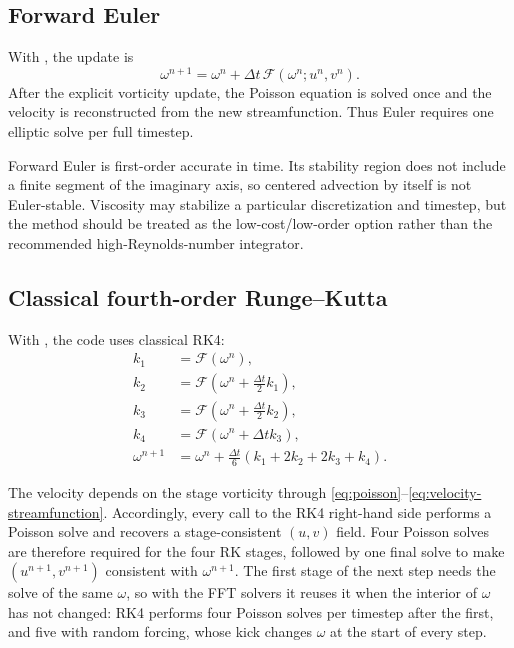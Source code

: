 \documentclass[11pt,a4paper]{article}
\newcommand{\dt}{\Delta t}
\newcommand{\code}[1]{\texttt{\detokenize{#1}}}
\begin{document}
\subsection{Forward Euler}

With \code{time_scheme = 1}, the update is
\begin{equation}
\omega^{n+1}
=\omega^n+\dt\,\mathcal{F}(\omega^n;u^n,v^n).
\label{eq:euler}
\end{equation}
After the explicit vorticity update, the Poisson equation is solved once and the velocity is reconstructed from the new streamfunction.  Thus Euler requires one elliptic solve per full timestep.

Forward Euler is first-order accurate in time.  Its stability region does not include a finite segment of the imaginary axis, so centered advection by itself is not Euler-stable.  Viscosity may stabilize a particular discretization and timestep, but the method should be treated as the low-cost/low-order option rather than the recommended high-Reynolds-number integrator.

\subsection{Classical fourth-order Runge--Kutta}

With \code{time_scheme = 2}, the code uses classical RK4:
\begin{align}
k_1 &= \mathcal{F}(\omega^n),\\
k_2 &= \mathcal{F}\left(\omega^n+\frac{\dt}{2}k_1\right),\\
k_3 &= \mathcal{F}\left(\omega^n+\frac{\dt}{2}k_2\right),\\
k_4 &= \mathcal{F}\left(\omega^n+\dt k_3\right),\\
\omega^{n+1} &= \omega^n+
\frac{\dt}{6}\left(k_1+2k_2+2k_3+k_4\right).
\label{eq:rk4}
\end{align}

The velocity depends on the stage vorticity through \cref{eq:poisson}--\cref{eq:velocity-streamfunction}.  Accordingly, every call to the RK4 right-hand side performs a Poisson solve and recovers a stage-consistent $(u,v)$ field.  Four Poisson solves are therefore required for the four RK stages, followed by one final solve to make $(u^{n+1},v^{n+1})$ consistent with $\omega^{n+1}$.  The first stage of the next step needs the solve of the same $\omega$, so with the FFT solvers it reuses it when the interior of $\omega$ has not changed: RK4 performs four Poisson solves per timestep after the first, and five with random forcing, whose kick changes $\omega$ at the start of every step.
\end{document}
